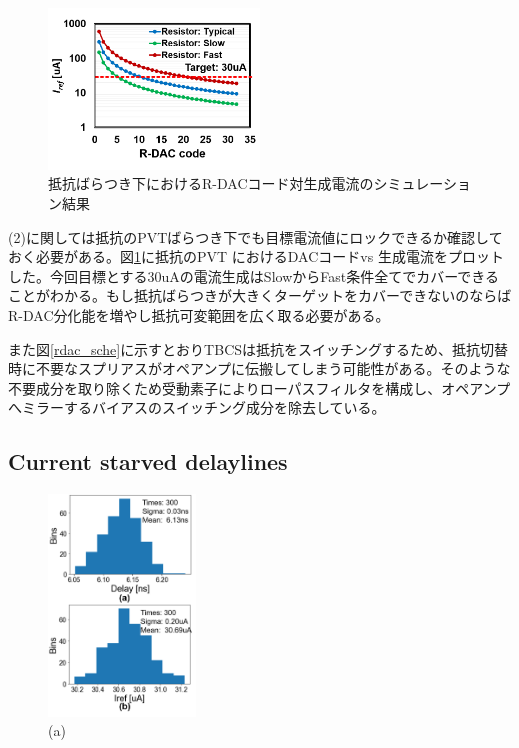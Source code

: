 \documentclass[letterpaper, 10 pt, conference]{ieeeconf}  %
\begin{document}
\begin{figure}[!]
\centering
 \includegraphics[width=0.5\textwidth]{figs/rdaccode.png}
  \caption{抵抗ばらつき下におけるR-DACコード対生成電流のシミュレーション結果}
\label{rdac_pvt}
\end{figure}

(2)に関しては抵抗のPVTばらつき下でも目標電流値にロックできるか確認しておく必要がある。図\ref{rdac_pvt}に抵抗のPVT におけるDACコードvs 生成電流をプロットした。今回目標とする30uAの電流生成はSlowからFast条件全てでカバーできることがわかる。もし抵抗ばらつきが大きくターゲットをカバーできないのならばR-DAC分化能を増やし抵抗可変範囲を広く取る必要がある。

また図\ref{rdac_sche}に示すとおりTBCSは抵抗をスイッチングするため、抵抗切替時に不要なスプリアスがオペアンプに伝搬してしまう可能性がある。そのような不要成分を取り除くため受動素子によりローパスフィルタを構成し、オペアンプへミラーするバイアスのスイッチング成分を除去している。

\subsection{Current starved delaylines}
\begin{figure}[!]
\centering
 \includegraphics[width=0.35\textwidth]{figs/mc.png}
  \caption{(a) 
}
\label{monte}
\end{figure}
\end{document}
